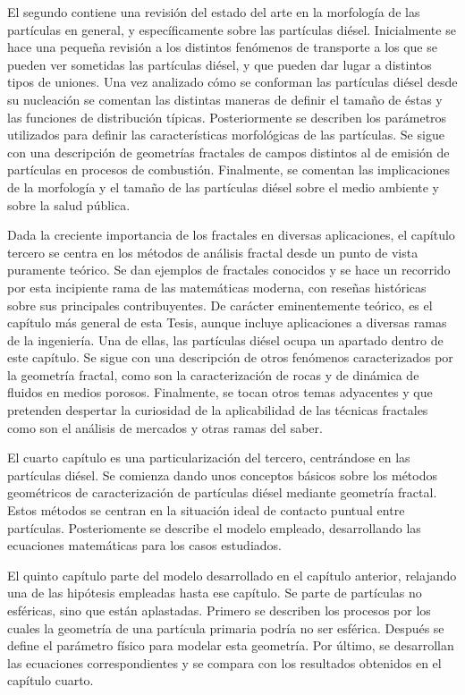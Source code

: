 \par El segundo contiene una revisión del estado del arte en la morfología de las partículas en general, y específicamente sobre las partículas diésel. Inicialmente se hace una pequeña revisión a los distintos fenómenos de transporte a los que se pueden ver sometidas las partículas diésel, y que pueden dar lugar a distintos tipos de uniones. Una vez analizado cómo se conforman las partículas diésel desde su nucleación se comentan las distintas maneras de definir el tamaño de éstas y las funciones de distribución típicas. Posteriormente se describen los parámetros utilizados para definir las características morfológicas de las partículas. Se sigue con una descripción de geometrías fractales de campos distintos al de emisión de partículas en procesos de combustión. Finalmente, se comentan las implicaciones de la morfología y el tamaño de las partículas diésel sobre el medio ambiente y sobre la salud pública.

\par Dada la creciente importancia de los fractales en diversas aplicaciones, el capítulo tercero se centra en los métodos de análisis fractal desde un punto de vista puramente teórico. Se dan ejemplos de fractales conocidos y se hace un recorrido por esta incipiente rama de las matemáticas moderna, con reseñas históricas sobre sus principales contribuyentes. De carácter eminentemente teórico, es el capítulo más general de esta Tesis, aunque incluye aplicaciones a diversas ramas de la ingeniería. Una de ellas, las partículas diésel ocupa un apartado dentro de este capítulo. Se sigue con una descripción de otros fenómenos caracterizados por la geometría fractal, como son la caracterización de rocas y de dinámica de fluidos en medios porosos. Finalmente, se tocan otros temas adyacentes y que pretenden despertar la curiosidad de la aplicabilidad de las técnicas fractales como son el análisis de mercados y otras ramas del saber.

\par El cuarto capítulo es una particularización del tercero, centrándose en las partículas diésel. Se comienza dando unos conceptos básicos sobre los métodos geométricos de caracterización de partículas diésel mediante geometría fractal. Estos métodos se centran en la situación ideal de contacto puntual entre partículas. Posteriomente se describe el modelo empleado, desarrollando las ecuaciones matemáticas para los casos estudiados.

\par El quinto capítulo parte del modelo desarrollado en el capítulo anterior, relajando una de las hipótesis empleadas hasta ese capítulo. Se parte de partículas no esféricas, sino que están aplastadas. Primero se describen los procesos por los cuales la geometría de una partícula primaria podría no ser esférica. Después se define el parámetro físico para modelar esta geometría. Por último, se desarrollan las ecuaciones correspondientes y se compara con los resultados obtenidos en el capítulo cuarto.


